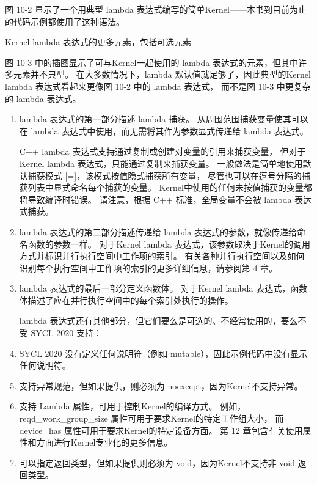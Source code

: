 图 10-2 显示了一个用典型 lambda 表达式编写的简单Kernel——本书到目前为止的代码示例都使用了这种语法。

{\color{red} Kernel lambda 表达式的更多元素，包括可选元素}

图 10-3 中的插图显示了可与Kernel一起使用的 lambda 表达式的元素，但其中许多元素并不典型。 
在大多数情况下，lambda 默认值就足够了，因此典型的Kernel lambda 表达式看起来更像图 10-2 中的 lambda 表达式，
而不是图 10-3 中更复杂的 lambda 表达式。

\begin{enumerate}
	\item lambda 表达式的第一部分描述 lambda 捕获。 
	从周围范围捕获变量使其可以在 lambda 表达式中使用，而无需将其作为参数显式传递给 lambda 表达式。

	C++ lambda 表达式支持通过复制或创建对变量的引用来捕获变量，
	但对于Kernel lambda 表达式，只能通过复制来捕获变量。 
	一般做法是简单地使用默认捕获模式 [=]，该模式按值隐式捕获所有变量，
	尽管也可以在逗号分隔的捕获列表中显式命名每个捕获的变量。 
	Kernel中使用的任何未按值捕获的变量都将导致编译时错误。 
	请注意，根据 C++ 标准，全局变量不会被 lambda 表达式捕获。

	\item lambda 表达式的第二部分描述传递给 lambda 表达式的参数，就像传递给命名函数的参数一样。 
	对于Kernel lambda 表达式，该参数取决于Kernel的调用方式并标识并行执行空间中工作项的索引。 
	有关各种并行执行空间以及如何识别每个执行空间中工作项的索引的更多详细信息，请参阅第 4 章。

	\item lambda 表达式的最后一部分定义函数体。 
	对于Kernel lambda 表达式，函数体描述了应在并行执行空间中的每个索引处执行的操作。

	lambda 表达式还有其他部分，但它们要么是可选的、不经常使用的，要么不受 SYCL 2020 支持：

	\item SYCL 2020 没有定义任何说明符（例如 mutable），因此示例代码中没有显示任何说明符。

	\item 支持异常规范，但如果提供，则必须为 noexcept，因为Kernel不支持异常。

	\item 支持 Lambda 属性，可用于控制Kernel的编译方式。 
	例如，reqd\_work\_group\_size 属性可用于要求Kernel的特定工作组大小，
	而 device\_has 属性可用于要求Kernel的特定设备方面。 
	第 12 章包含有关使用属性和方面进行Kernel专业化的更多信息。

	\item 可以指定返回类型，但如果提供则必须为 void，因为Kernel不支持非 void 返回类型。
\end{enumerate}

